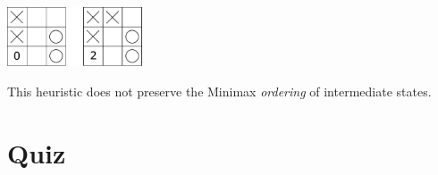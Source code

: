 \documentclass[11pt, a4paper]{article}
\begin{document}
\begin{enumerate}
\begin{solution}
        \begin{center}
            \includegraphics[width=0.3\textwidth]{figures/e2_misleading.pdf}
        \end{center}
        
        This heuristic does not preserve the Minimax \emph{ordering} of intermediate states.
    \end{solution}
    
\end{enumerate}

\newpage

\section{Quiz}
\end{document}
